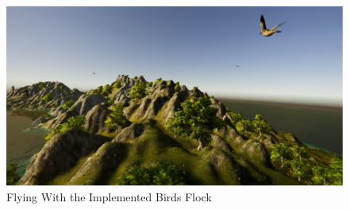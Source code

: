 \begin{figure}[ht]
    \centering
    \includegraphics[scale=.202]{Images/birds_flock.png}
    \caption{Flying With the Implemented Birds Flock}
    \label{fig:bird_flock_fly}
\end{figure}
